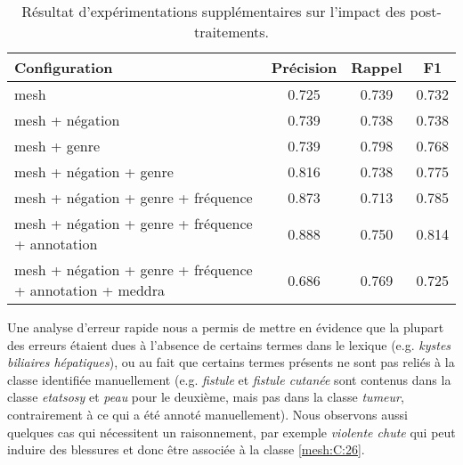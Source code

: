\begin{table}[htb]
    \centering
    \begin{tabular}{l|ccc}
        Configuration                                                                   & Précision   & Rappel      & F1          \\
        \hline
        \hline
        \acrshort{mesh}                                                                 & \num{0,725} & \num{0,739} & \num{0,732} \\
        \acrshort{mesh} + négation                                                      & \num{0,739} & \num{0,738} & \num{0,738} \\
        \acrshort{mesh} + genre                                                         & \num{0,739} & \num{0,798} & \num{0,768} \\
        \acrshort{mesh} + négation + genre                                              & \num{0,816} & \num{0,738} & \num{0,775} \\
        \acrshort{mesh} + négation + genre + fréquence                                  & \num{0,873} & \num{0,713} & \num{0,785} \\
        \acrshort{mesh} + négation + genre + fréquence + annotation                     & \num{0,888} & \num{0,750} & \num{0,814} \\
        \acrshort{mesh} + négation + genre + fréquence + annotation + \acrshort{meddra} & \num{0,686} & \num{0,769} & \num{0,725}
    \end{tabular}
    \caption{Résultat d'expérimentations supplémentaires sur l'impact des post-traitements.}
    \label{tab:class:result}
\end{table}

Une analyse d'erreur rapide nous a permis de mettre en évidence que la plupart des erreurs étaient dues à l'absence de certains termes dans le lexique (e.g. \emph{kystes biliaires hépatiques}), ou au fait que certains termes présents ne sont pas reliés à la classe identifiée manuellement (e.g. \emph{fistule} et \emph{fistule cutanée} sont contenus dans la classe \emph{etatsosy} et \emph{peau} pour le deuxième, mais pas dans la classe \emph{tumeur}, contrairement à ce qui a été annoté manuellement).
Nous observons aussi quelques cas qui nécessitent un raisonnement, par exemple \emph{violente chute} qui peut induire des blessures et donc être associée à la classe \ref{mesh:C:26}.

\FloatBarrier
